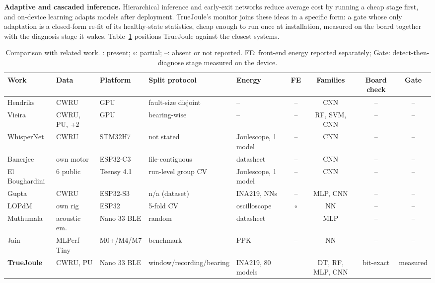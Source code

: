 \documentclass[conference]{IEEEtran}
\newcommand{\yes}{\ding{51}}
\newcommand{\no}{--}
\newcommand{\pt}{$\circ$}
\newcommand{\TJ}{TrueJoule}
\begin{document}
\textbf{Adaptive and cascaded inference.} Hierarchical inference \cite{alatat2023hierarchical} and early-exit networks
\cite{rahmath2024earlyexit} reduce average cost by running
a cheap stage first, and on-device learning \cite{ren2021tinyol} adapts models after deployment. \TJ{}'s monitor joins
these ideas in a specific form: a gate whose only adaptation is a closed-form re-fit of its healthy-state statistics,
cheap enough to run once at installation, measured on the board together with the diagnosis stage it wakes.
Table~\ref{tab:cmp} positions \TJ{} against the closest systems.

\begin{table}[t]
\caption{Comparison with related work. \yes: present; \pt: partial; \no: absent or not reported. FE: front-end
energy reported separately; Gate: detect-then-diagnose stage measured on the device.}
\label{tab:cmp}
\centering\footnotesize
\setlength{\tabcolsep}{3.2pt}
\begin{tabular}{@{}l l l l l c c c c@{}}
\toprule
Work & Data & Platform & Split protocol & Energy & FE & Families & Board check & Gate \\
\midrule
Hendriks \cite{hendriks2022towards} & CWRU & GPU & fault-size disjoint & \no & \no & CNN & \no & \no \\
Vieira \cite{vieira2026towards} & CWRU, PU, +2 & GPU & bearing-wise & \no & \no & RF, SVM, CNN & \no & \no \\
WhisperNet \cite{shoba2026whispernet} & CWRU & STM32H7 & not stated & Joulescope, 1 model & \no & CNN & \no & \no \\
Banerjee \cite{banerjee2026ondevice} & own motor & ESP32-C3 & file-contiguous & datasheet & \no & CNN & \no & \no \\
El Boughardini \cite{elboughardini2026effective} & 6 public & Teensy 4.1 & run-level group CV & Joulescope, 1 model & \no & CNN & \no & \no \\
Gupta \cite{gupta2026measured} & CWRU & ESP32-S3 & n/a (dataset) & INA219, NNs & \no & MLP, CNN & \no & \no \\
LOPdM \cite{chen2023lopdm} & own rig & ESP32 & 5-fold CV & oscilloscope & \pt & NN & \no & \no \\
Muthumala \cite{muthumala2024comparison} & acoustic em. & Nano 33 BLE & random & datasheet & \yes & MLP & \no & \no \\
Jain \cite{jain2025pareto} & MLPerf Tiny & M0+/M4/M7 & benchmark & PPK & \no & NN & \no & \no \\
\midrule
\textbf{TrueJoule} & CWRU, PU & Nano 33 BLE & window/recording/bearing & INA219, 80 models & \yes & DT, RF, MLP, CNN & bit-exact & measured \\
\bottomrule
\end{tabular}
\end{table}
\end{document}
